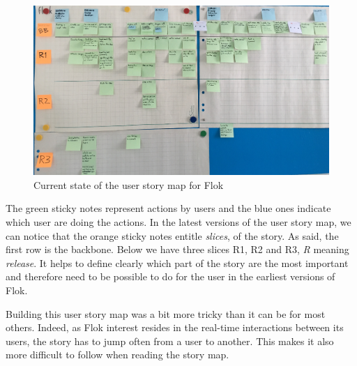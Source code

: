 \documentclass[a4paper,12pt, oneside]{article}
\begin{document}
\begin{figure}[!htb]
\centering
\includegraphics[width=\textwidth]{images/flokUsmCurrent.jpg}
\caption{Current state of the user story map for Flok}
\label{fig.flokUsmCurrent}
\end{figure}

The green sticky notes represent actions by users and the blue ones indicate which user are doing the actions.
In the latest versions of the user story map, we can notice that the orange sticky notes entitle \emph{slices}, of the story.
As said, the first row is the backbone.
Below we have three slices R1, R2 and R3, \emph{R} meaning \emph{release}.
It helps to define clearly which part of the story are the most important and therefore need to be possible to do for the user in the earliest versions of Flok.

Building this user story map was a bit more tricky than it can be for most others.
Indeed, as Flok interest resides in the real-time interactions between its users, the story has to jump often from a user to another.
This makes it also more difficult to follow when reading the story map.

\FloatBarrier
\end{document}
